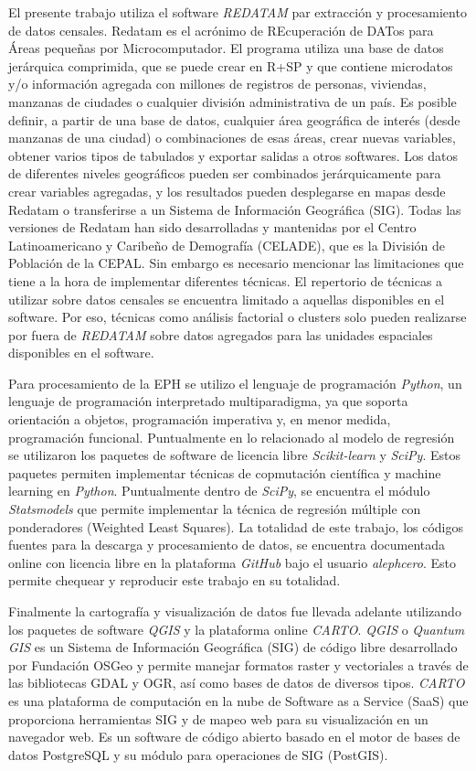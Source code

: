 El presente trabajo utiliza el software \textit{REDATAM} par extracción y procesamiento de datos censales. Redatam es el acrónimo de REcuperación de DATos para Áreas pequeñas por Microcomputador.  El programa utiliza una base de datos jerárquica comprimida, que se puede crear en R+SP y que contiene microdatos y/o información agregada con millones de registros de personas, viviendas, manzanas de ciudades o cualquier división administrativa de un país. Es posible definir, a partir de una base de datos, cualquier área geográfica de interés (desde manzanas de una ciudad) o combinaciones de esas áreas, crear nuevas variables, obtener varios tipos de tabulados y exportar salidas a otros softwares. Los datos de diferentes niveles geográficos pueden ser combinados jerárquicamente para crear variables agregadas, y los resultados pueden desplegarse en mapas desde Redatam o transferirse a un Sistema de Información Geográfica (SIG). Todas las versiones de Redatam han sido desarrolladas y mantenidas por el Centro Latinoamericano y Caribeño de Demografía (CELADE), que es la División de Población de la CEPAL. Sin embargo es necesario mencionar las limitaciones que tiene a la hora de implementar diferentes técnicas. El repertorio de técnicas a utilizar sobre datos censales se encuentra limitado a aquellas disponibles en el software. Por eso, técnicas como análisis factorial o clusters solo pueden realizarse por fuera de \textit{REDATAM} sobre datos agregados para las unidades espaciales disponibles en el software. 

Para procesamiento de la EPH se utilizo el lenguaje de programación \textit{Python}, un lenguaje de programación interpretado multiparadigma, ya que soporta orientación a objetos, programación imperativa y, en menor medida, programación funcional. Puntualmente en lo relacionado al modelo de regresión se utilizaron los paquetes de software de licencia libre \textit{Scikit-learn} y \textit{SciPy}. Estos paquetes permiten implementar técnicas de copmutación científica y machine learning en \textit{Python}. Puntualmente dentro de \textit{SciPy}, se encuentra el módulo \textit{Statsmodels} que permite implementar la técnica de regresión múltiple con ponderadores (Weighted Least Squares). La totalidad de este trabajo, los códigos fuentes para la descarga y procesamiento de datos, se encuentra documentada online con licencia libre en la plataforma \textit{GitHub} bajo el usuario \textit{alephcero}. Esto permite chequear y reproducir este trabajo en su totalidad.

Finalmente la cartografía y visualización de datos fue llevada adelante utilizando los paquetes de software \textit{QGIS} y la plataforma online \textit{CARTO}. \textit{QGIS} o \textit{Quantum GIS} es un Sistema de Información Geográfica (SIG) de código libre desarrollado por Fundación OSGeo y permite manejar formatos raster y vectoriales a través de las bibliotecas GDAL y OGR, así como bases de datos de diversos tipos. \textit{CARTO}  es una plataforma de computación en la nube de Software as a Service (SaaS) que proporciona herramientas SIG y de mapeo web para su visualización en un navegador web. Es un software de código abierto basado en el motor de bases de datos PostgreSQL  y su módulo para operaciones de SIG (PostGIS). 

